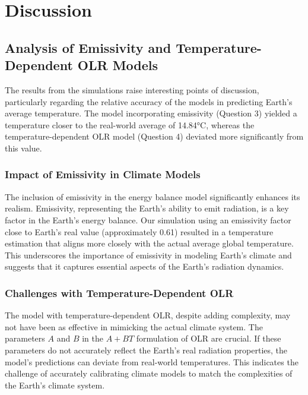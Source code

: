 \documentclass[12pt]{article}
\begin{document}
\section{Discussion}

\subsection{Analysis of Emissivity and Temperature-Dependent OLR Models}


The results from the simulations raise interesting points of discussion, 
particularly regarding the relative accuracy of the models 
in predicting Earth's average temperature. 
The model incorporating emissivity (Question 3) yielded 
a temperature closer to the real-world average of 14.84°C, 
whereas the temperature-dependent OLR model (Question 4) 
deviated more significantly from this value.

\subsubsection{Impact of Emissivity in Climate Models}
The inclusion of emissivity in the energy balance model significantly 
enhances its realism. Emissivity, representing the Earth's ability to emit
 radiation, is a key factor in the Earth's energy balance. 
 Our simulation using an emissivity factor close to Earth's real value 
 (approximately 0.61) resulted in a temperature estimation that aligns
  more closely with the actual average global temperature. 
  This underscores the importance of emissivity in modeling Earth's climate 
  and suggests that it captures essential aspects of the Earth's radiation
   dynamics.

\subsubsection{Challenges with Temperature-Dependent OLR}
The model with temperature-dependent OLR, despite adding complexity, 
may not have been as effective in mimicking the actual climate system. 
The parameters \( A \) and \( B \) in the \( A + BT \) formulation of OLR 
are crucial. If these parameters do not accurately reflect the Earth's real 
radiation properties, 
the model's predictions can deviate from real-world temperatures. 
This indicates the challenge of accurately calibrating climate models 
to match the complexities of the Earth's climate system.
\end{document}

